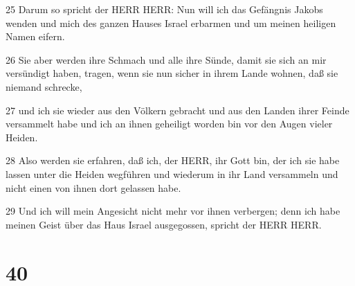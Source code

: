 \par 25 Darum so spricht der HERR HERR: Nun will ich das Gefängnis Jakobs wenden und mich des ganzen Hauses Israel erbarmen und um meinen heiligen Namen eifern.
\par 26 Sie aber werden ihre Schmach und alle ihre Sünde, damit sie sich an mir versündigt haben, tragen, wenn sie nun sicher in ihrem Lande wohnen, daß sie niemand schrecke,
\par 27 und ich sie wieder aus den Völkern gebracht und aus den Landen ihrer Feinde versammelt habe und ich an ihnen geheiligt worden bin vor den Augen vieler Heiden.
\par 28 Also werden sie erfahren, daß ich, der HERR, ihr Gott bin, der ich sie habe lassen unter die Heiden wegführen und wiederum in ihr Land versammeln und nicht einen von ihnen dort gelassen habe.
\par 29 Und ich will mein Angesicht nicht mehr vor ihnen verbergen; denn ich habe meinen Geist über das Haus Israel ausgegossen, spricht der HERR HERR.

\chapter{40}

